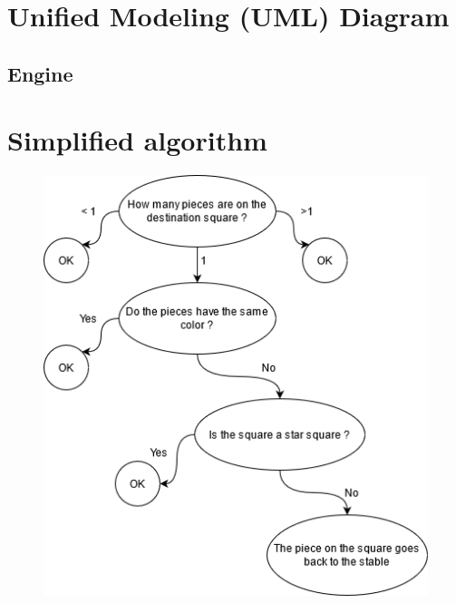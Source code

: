 \documentclass[english, 11pt, titlepage]{article}
\begin{document}
    \pagebreak
    \appendix
    \appendixpage
    \addappheadtotoc
    \section{Unified Modeling (UML) Diagram}
    \subsection{Engine}

    \pagebreak
    \section{Simplified algorithm}
    \label{fig:algorithm}
    \begin{figure}[h]
        \centering
        \vspace{0.3cm}
        \includegraphics{Logigram.png}
    \end{figure}
    
\end{document}
